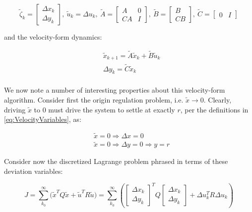 \begin{equation}\label{eq:VelocityMatrices}
	\tilde{\zeta}_k = \begin{bmatrix} \Delta x_k \\ \Delta y_k	\end{bmatrix}, \ \tilde{u}_k = \Delta u_k, \
	\tilde{A} = \begin{bmatrix} A & 0 \\ CA & I	\end{bmatrix}, \ 
	\tilde{B} = \begin{bmatrix} B \\ CB	\end{bmatrix}, \ \tilde{C} = \begin{bmatrix} 0 & I	\end{bmatrix}
\end{equation}

and the velocity-form dynamics:

\begin{align}\label{eq:VelocityDynamics}
	&\tilde{x}_{k+1} = \tilde{A}\tilde{x}_k + \tilde{B}\tilde{u}_k \\
	&\Delta y_k = \tilde{C}\tilde{x}_k \\
\end{align}

We now note a number of interesting properties about this velocity-form algorithm. Consider first the origin regulation problem, i.e. $\tilde{x} \rightarrow 0$. Clearly, driving $\tilde{x}$ to $0$ must drive the system to settle at exactly $r$, per the definitions in \cref{eq:VelocityVariables}, as:

\begin{equation}\label{eq:VelocityDriveToOrigin}
	\begin{split}
		&\tilde{x} = 0 \Rightarrow \Delta x = 0 \\ 
		&\tilde{x} = 0 \Rightarrow \Delta y = 0 \Rightarrow y = r
	\end{split}
\end{equation}

Consider now the discretized Lagrange problem phrased in terms of these deviation variables:

\begin{equation}\label{eq:LagrangeProblemDeviation}
	J = \sum_{k_0}^{\infty} \big(\tilde{x}^TQ\tilde{x} + \tilde{u}^TR\tilde{u}\big) = \sum_{k_0}^{\infty}\left( \begin{bmatrix} \Delta x_k \\ \Delta y_k\end{bmatrix}^T Q
	\begin{bmatrix} \Delta x_k \\ \Delta y_k\end{bmatrix} + 
	\Delta u_k^TR\Delta u_k \right)
\end{equation} 

